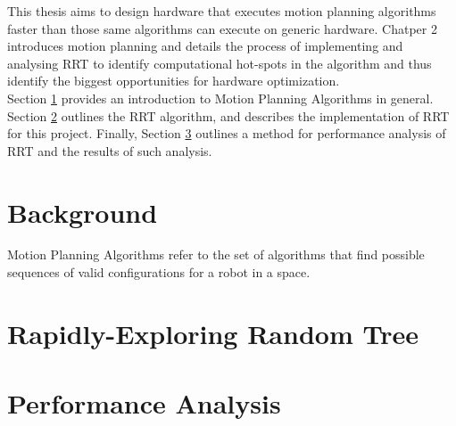 
This thesis aims to design hardware that executes motion planning algorithms faster than those same algorithms can execute on generic hardware. Chatper 2 introduces motion planning and details the process of implementing and analysing \ac{RRT} to identify computational hot-spots in the algorithm and thus identify the biggest opportunities for hardware optimization. \\
Section \ref{section:motion_planning_background} provides an introduction to Motion Planning Algorithms in general. Section \ref{section:rrt} outlines the \ac{RRT} algorithm, and describes the implementation of \ac{RRT} for this project. Finally, Section \ref{section:rrt_analysis} outlines a method for performance analysis of \ac{RRT} and the results of such analysis.

\section{Background} 
\label{section:motion_planning_background}
    Motion Planning Algorithms refer to the set of algorithms that find possible sequences of valid configurations for a robot in a space.
    \newline
    \newline

\newpage
\section{Rapidly-Exploring Random Tree}
\label{section:rrt}
    

\newpage
\section{Performance Analysis}
\label{section:rrt_analysis}
    